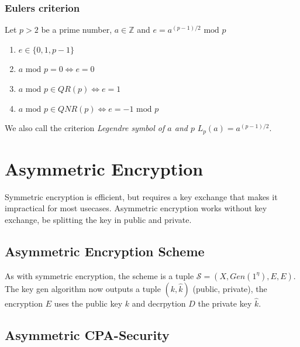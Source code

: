 \hypertarget{eulers-criterion}{%
\subsubsection{Eulers criterion}\label{eulers-criterion}}

Let \(p > 2\) be a prime number, \(a \in \mathbb{Z}\) and
\(e = a^{(p-1)/2} \text{ mod } p\)

\begin{enumerate}
\def\labelenumi{\arabic{enumi}.}
\tightlist
\item
  \(e \in \{0, 1, p-1\}\)
\item
  \(a \text{ mod } p = 0 \Leftrightarrow e = 0\)
\item
  \(a \text{ mod } p \in QR(p) \Leftrightarrow e = 1\)
\item
  \(a \text{ mod } p \in QNR(p) \Leftrightarrow e = -1 \text{ mod } p\)
\end{enumerate}

We also call the criterion \emph{Legendre symbol of \(a\) and \(p\)}
\(L_p(a) = a^{(p-1)/2}\).

\hypertarget{asymmetric-encryption}{%
\section{Asymmetric Encryption}\label{asymmetric-encryption}}

Symmetric encryption is efficient, but requires a key exchange that
makes it impractical for most usecases. Asymmetric encryption works
without key exchange, be splitting the key in public and private.

\hypertarget{asymmetric-encryption-scheme}{%
\subsection{Asymmetric Encryption
Scheme}\label{asymmetric-encryption-scheme}}

As with symmetric encryption, the scheme is a tuple
\(\mathcal{S} = (X, Gen(1^\eta), E, E)\). The key gen algorithm now
outputs a tuple \((k, \hat{k})\) (public, private), the encryption \(E\)
uses the public key \(k\) and decrpytion \(D\) the private key
\(\hat{k}\).

\hypertarget{asymmetric-cpa-security}{%
\subsection{Asymmetric CPA-Security}\label{asymmetric-cpa-security}}

